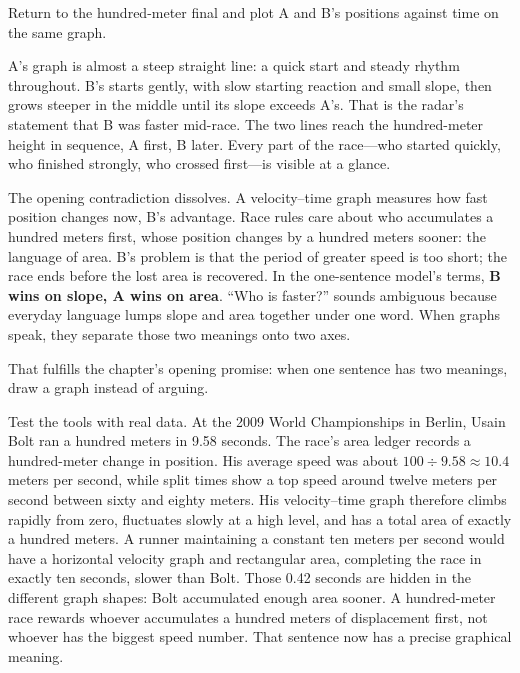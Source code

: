 
Return to the hundred-meter final and plot A and B's positions against time on the same graph.

\begin{center}
\end{center}

A's graph is almost a steep straight line: a quick start and steady rhythm throughout. B's starts gently, with slow starting reaction and small slope, then grows steeper in the middle until its slope exceeds A's. That is the radar's statement that B was faster mid-race. The two lines reach the hundred-meter height in sequence, A first, B later. Every part of the race---who started quickly, who finished strongly, who crossed first---is visible at a glance.

The opening contradiction dissolves. A velocity--time graph measures how fast position changes now, B's advantage. Race rules care about who accumulates a hundred meters first, whose position changes by a hundred meters sooner: the language of area. B's problem is that the period of greater speed is too short; the race ends before the lost area is recovered. In the one-sentence model's terms, \textbf{B wins on slope, A wins on area}. ``Who is faster?'' sounds ambiguous because everyday language lumps slope and area together under one word. When graphs speak, they separate those two meanings onto two axes.

That fulfills the chapter's opening promise: when one sentence has two meanings, draw a graph instead of arguing.

Test the tools with real data. At the 2009 World Championships in Berlin, Usain Bolt ran a hundred meters in 9.58 seconds. The race's area ledger records a hundred-meter change in position. His average speed was about \(100\div 9.58\approx 10.4\) meters per second, while split times show a top speed around twelve meters per second between sixty and eighty meters. His velocity--time graph therefore climbs rapidly from zero, fluctuates slowly at a high level, and has a total area of exactly a hundred meters. A runner maintaining a constant ten meters per second would have a horizontal velocity graph and rectangular area, completing the race in exactly ten seconds, slower than Bolt. Those 0.42 seconds are hidden in the different graph shapes: Bolt accumulated enough area sooner. A hundred-meter race rewards whoever accumulates a hundred meters of displacement first, not whoever has the biggest speed number. That sentence now has a precise graphical meaning.

